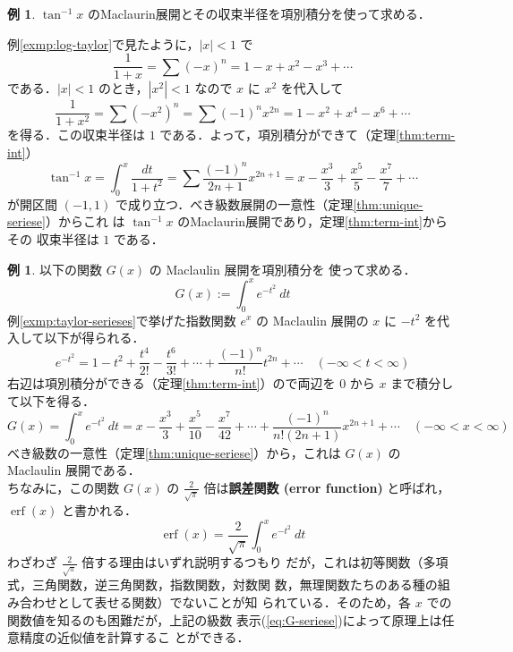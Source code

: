 \documentclass[10pt, uplatex, dvipdfmx]{jsarticle}
\theoremstyle{definition}
\newtheorem{example}[theorem]{例}
\numberwithin{equation}{section}
\newcommand{\ds}{\displaystyle}
\DeclareMathOperator{\erf}{erf}
\begin{document}
\begin{example}\label{exmp:atan-taylor}
  $\tan^{-1}x$ のMaclaurin展開とその収束半径を項別積分を使って求める．

  例\ref{exmp:log-taylor}で見たように，$|x|<1$ で
  \[
    \frac{1}{1+x} = \sum (-x)^n = 1 - x + x^2 - x^3 + \cdots
  \]
  である．$|x| <1$ のとき，$|x^2|<1$ なので $x$ に $x^2$ を代入して
  \[
    \frac{1}{1+x^2} = \sum(-x^2)^n=\sum (-1)^n x^{2n}
    =1 -x^2 + x^4 - x^6 + \cdots 
  \]
  を得る．この収束半径は $1$ である．よって，項別積分ができて（定理\ref{thm:term-int}）
  \[
    \tan^{-1}x = \int_{0}^{x}\frac{dt}{1+t^2} = \sum \frac{(-1)^n}{2n+1}x^{2n+1}
    = x - \frac{x^3}{3} + \frac{x^5}{5} - \frac{x^7}{7} + \cdots
  \]
  が開区間 $(-1,1)$ で成り立つ．べき級数展開の一意性（定理\ref{thm:unique-seriese}）からこれ
  は $\tan^{-1}x$ のMaclaurin展開であり，定理\ref{thm:term-int}からその
  収束半径は $1$ である．
\end{example}

\begin{example}\label{exmp:int-exp-x2-taylor}
  以下の関数 $G(x)$ の Maclaulin 展開を項別積分を
  使って求める．
  \[
    G(x) := \int_{0}^{x} e^{-t^2} \ dt
  \]
  例\ref{exmp:taylor-serieses}で挙げた指数関数 $e^x$ の Maclaulin 展開の $x$ に $-t^2$ を代入して以下が得られる．
  \[
    e^{-t^2} = 1 - t^2 + \frac{t^4}{2!} - \frac{t^6}{3!} + \cdots + \frac{(-1)^n}{n!}t^{2n} + \cdots \quad (- \infty < t < \infty)
  \]
  右辺は項別積分ができる（定理\ref{thm:term-int}）ので両辺を $0$ から $x$ まで積分して以下を得る．
  \begin{equation}\label{eq:G-seriese}
    G(x) = \int_{0}^{x}e^{-t^2} \ dt = x - \frac{x^3}{3} + \frac{x^5}{10} - \frac{x^7}{42} + \cdots + \frac{(-1)^n}{n! (2n+1)}x^{2n+1} + \cdots
    \quad (- \infty < x < \infty)
  \end{equation}
  べき級数の一意性（定理\ref{thm:unique-seriese}）から，これは $G(x)$ の Maclaulin 展開である．\\
 

  
  ちなみに，この関数 $G(x)$ の $\ds \frac{2}{\sqrt{\pi}}$ 倍は\textbf{誤差関数 (error function)}
  と呼ばれ，$\erf(x)$ と書かれる．
  \[
    \erf (x) = \frac{2}{\sqrt{\pi}}\int_{0}^{x} e^{-t^2} \ dt 
  \]
  わざわざ $\ds \frac{2}{\sqrt{\pi}}$ 倍する理由はいずれ説明するつもり
  だが，これは初等関数（多項式，三角関数，逆三角関数，指数関数，対数関
  数，無理関数たちのある種の組み合わせとして表せる関数）でないことが知
  られている．そのため，各 $x$ での関数値を知るのも困難だが，上記の級数
  表示(\ref{eq:G-seriese})によって原理上は任意精度の近似値を計算するこ
  とができる．
\end{example}
\end{document}
